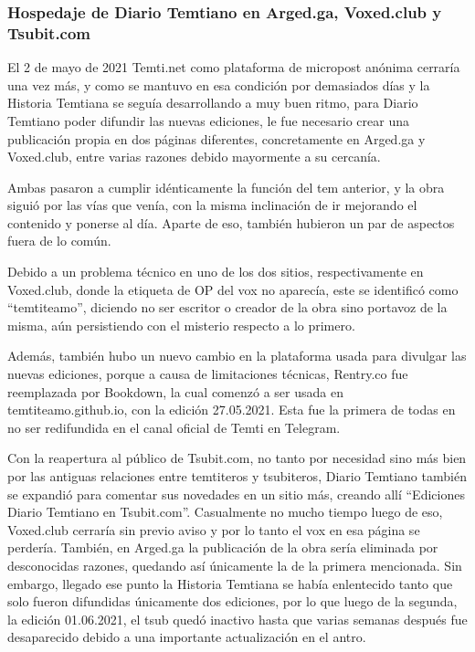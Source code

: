 \documentclass[
  spanish,
]{book}
\begin{document}
\hypertarget{hospedaje-de-diario-temtiano-en-arged.ga-voxed.club-y-tsubit.com}{%
\subsubsection*{Hospedaje de Diario Temtiano en Arged.ga, Voxed.club y Tsubit.com}\label{hospedaje-de-diario-temtiano-en-arged.ga-voxed.club-y-tsubit.com}}

El 2 de mayo de 2021 Temti.net como plataforma de micropost anónima cerraría una vez más, y como se mantuvo en esa condición por demasiados días y la Historia Temtiana se seguía desarrollando a muy buen ritmo, para Diario Temtiano poder difundir las nuevas ediciones, le fue necesario crear una publicación propia en dos páginas diferentes, concretamente en Arged.ga y Voxed.club, entre varias razones debido mayormente a su cercanía.

Ambas pasaron a cumplir idénticamente la función del tem anterior, y la obra siguió por las vías que venía, con la misma inclinación de ir mejorando el contenido y ponerse al día. Aparte de eso, también hubieron un par de aspectos fuera de lo común.

Debido a un problema técnico en uno de los dos sitios, respectivamente en Voxed.club, donde la etiqueta de OP del vox no aparecía, este se identificó como ``temtiteamo'', diciendo no ser escritor o creador de la obra sino portavoz de la misma, aún persistiendo con el misterio respecto a lo primero.

Además, también hubo un nuevo cambio en la plataforma usada para divulgar las nuevas ediciones, porque a causa de limitaciones técnicas, Rentry.co fue reemplazada por Bookdown, la cual comenzó a ser usada en temtiteamo.github.io, con la edición 27.05.2021. Esta fue la primera de todas en no ser redifundida en el canal oficial de Temti en Telegram.

Con la reapertura al público de Tsubit.com, no tanto por necesidad sino más bien por las antiguas relaciones entre temtiteros y tsubiteros, Diario Temtiano también se expandió para comentar sus novedades en un sitio más, creando allí ``Ediciones Diario Temtiano en Tsubit.com''. Casualmente no mucho tiempo luego de eso, Voxed.club cerraría sin previo aviso y por lo tanto el vox en esa página se perdería. También, en Arged.ga la publicación de la obra sería eliminada por desconocidas razones, quedando así únicamente la de la primera mencionada. Sin embargo, llegado ese punto la Historia Temtiana se había enlentecido tanto que solo fueron difundidas únicamente dos ediciones, por lo que luego de la segunda, la edición 01.06.2021, el tsub quedó inactivo hasta que varias semanas después fue desaparecido debido a una importante actualización en el antro.
\end{document}
